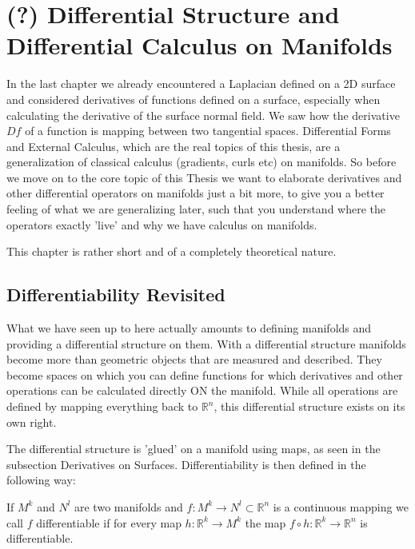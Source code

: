 \chapter{(?) Differential Structure and Differential Calculus on Manifolds}

In the last chapter we already encountered a Laplacian defined on a 2D surface and considered derivatives of functions defined on a surface, especially when calculating the derivative of the surface normal field. We saw how the derivative $Df$ of a function is mapping between two tangential spaces. Differential Forms and External Calculus, which are the real topics of this thesis, are a generalization of classical calculus (gradients, curls etc) on manifolds.  So before we move on to the core topic of this Thesis we want to elaborate derivatives and other differential operators on manifolds just a bit more, to give you a better feeling of what we are generalizing later, such that you understand where the operators exactly 'live' and why we have calculus on manifolds.

This chapter is rather short and of a completely theoretical nature.

\section{Differentiability Revisited}
What we have seen up to here actually amounts to defining manifolds and providing a differential structure on them. With a differential structure manifolds become more than geometric objects that are measured and described. They become spaces on which you can define functions for which derivatives and other operations can be calculated directly ON the manifold. While all operations are defined by mapping everything back to $\mathbb R^n$, this differential structure exists on its own right.

The differential structure is 'glued' on a manifold using maps, as seen in the subsection Derivatives on Surfaces. Differentiability is then defined in the following way:

\begin{definition}[Differentiability] If $M^k$ and $N^l$ are two manifolds and $f: M^k \rightarrow N^l \subset \mathbb R^n$ is a continuous mapping we call $f$ differentiable if for every map $h:\mathbb R^k \rightarrow M^k$ the map $f \circ h :  \mathbb R^k \rightarrow \mathbb R^n$ is differentiable.
\end{definition}

